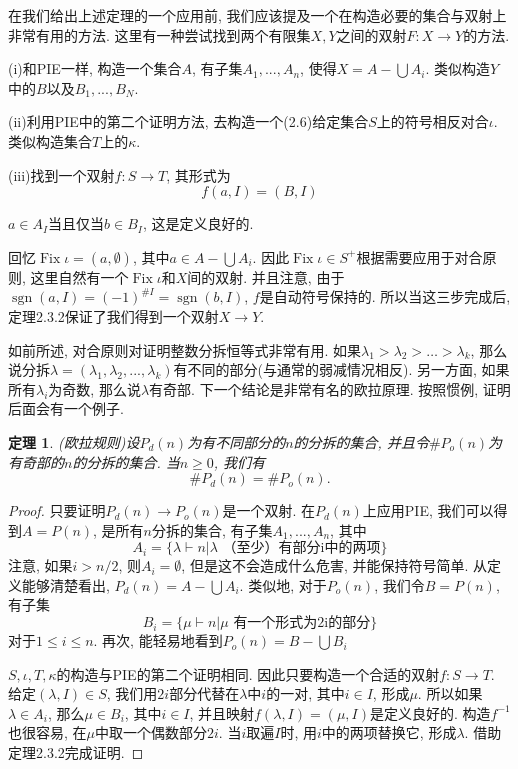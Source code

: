 \documentclass{ctexbook}
\newtheorem{thm}{定理}[section]
\begin{document}
	在我们给出上述定理的一个应用前, 我们应该提及一个在构造必要的集合与双射上非常有用的方法. 这里有一种尝试找到两个有限集$X,Y$之间的双射$F:X\rightarrow Y$的方法.

	(i)和PIE一样, 构造一个集合$A$, 有子集$A_{1},...,A_{n}$, 使得$X=A-\bigcup A_{i}$. 类似构造$Y$中的$B$以及$B_{1},...,B_{N}$.

	(ii)利用PIE中的第二个证明方法, 去构造一个(2.6)给定集合$S$上的符号相反对合$\iota$. 类似构造集合$T$上的$\kappa$.

	(iii)找到一个双射$f:S\rightarrow T$, 其形式为
\[
	f(a,I)=(B,I)
\]

	$a\in A_{I}$当且仅当$b\in B_{I}$, 这是定义良好的.

	\noindent 回忆$\operatorname{Fix}\iota =(a,\emptyset)$, 其中$a\in A-\bigcup A_{i}$. 因此$\operatorname{Fix}\iota \in S^{+}$根据需要应用于对合原则, 这里自然有一个$\operatorname{Fix}\iota$和$X$间的双射. 并且注意, 由于$\operatorname{sgn}(a,I)=(-1)^{\# I}=\operatorname{sgn}(b,I)$, $f$是自动符号保持的. 所以当这三步完成后, 定理2.3.2保证了我们得到一个双射$X\rightarrow Y$.

	如前所述, 对合原则对证明整数分拆恒等式非常有用. 如果$\lambda_{1}>\lambda_{2}>\ldots >\lambda_{k}$, 那么说分拆$\lambda=(\lambda_{1},\lambda_{2},...,\lambda_{k})$有不同的部分(与通常的弱减情况相反). 另一方面, 如果所有$\lambda_{i}$为奇数, 那么说$\lambda$有奇部. 下一个结论是非常有名的欧拉原理. 按照惯例, 证明后面会有一个例子.
\begin{thm}
	(欧拉规则)设$P_{d}(n)$为有不同部分的$n$的分拆的集合, 并且令$\# P_{o}(n)$为有奇部的$n$的分拆的集合. 当$n\geq 0$, 我们有
	\[
	\# P_{d}(n)=\# P_{o}(n).
	\]
\end{thm}
\begin{proof}
	只要证明$P_{d}(n)\rightarrow P_{o}(n)$是一个双射. 在$P_{d}(n)$上应用PIE, 我们可以得到$A=P(n)$, 是所有$n$分拆的集合, 有子集$A_{1},...,A_{n}$, 其中
	\[
	A_{i}=\{\lambda \vdash n | \lambda \text{ （至少）有部分i中的两项}\}
	\]
	注意, 如果$i>n/2$, 则$A_{i}=\emptyset$, 但是这不会造成什么危害, 并能保持符号简单. 从定义能够清楚看出, $P_{d}(n)=A-\bigcup A_{i}$. 类似地, 对于$P_{o}(n)$, 我们令$B=P(n)$, 有子集
	\[
	B_{i}=\{\mu \vdash n | \mu \text{ 有一个形式为2i的部分}\}
	\]
	对于$1\leq i\leq n$. 再次, 能轻易地看到$P_{o}(n)=B-\bigcup B_{i}$
	
	$S,\iota,T,\kappa$的构造与PIE的第二个证明相同. 因此只要构造一个合适的双射$f:S\rightarrow T$. 给定$(\lambda,I)\in S$, 我们用$2i$部分代替在$\lambda$中$i$的一对, 其中$i\in I$, 形成$\mu$. 所以如果$\lambda \in A_{i}$, 那么$\mu\in B_{i}$, 其中$i\in I$, 并且映射$f(\lambda,I)=(\mu,I)$是定义良好的. 构造$f^{-1}$也很容易, 在$\mu$中取一个偶数部分$2i$. 当$i$取遍$I$时, 用$i$中的两项替换它, 形成$\lambda$. 借助定理2.3.2完成证明.
\end{proof}
\end{document}
